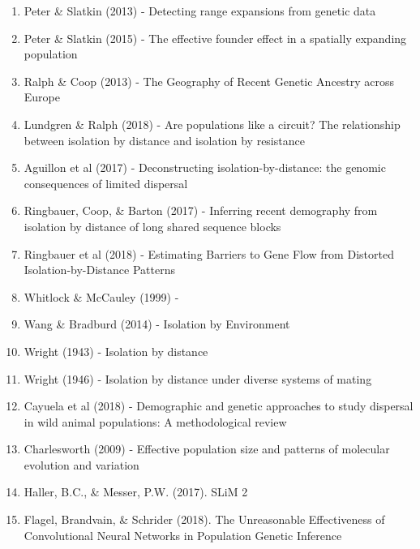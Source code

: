 \documentclass[12pt]{article}
\begin{document}
\begin{enumerate}
\item Peter \& Slatkin (2013) - Detecting range expansions from genetic data
\subitem 

\item Peter \& Slatkin (2015) - The effective founder effect in a spatially expanding population
\subitem 

\item Ralph \& Coop (2013) - The Geography of Recent Genetic Ancestry across Europe
\subitem 

\item Lundgren \& Ralph (2018) - Are populations like a circuit? 
The relationship between isolation by distance and isolation by resistance
\subitem 

\item Aguillon et al (2017) - Deconstructing isolation-by-distance: the genomic consequences of limited dispersal
\subitem 

\item Ringbauer, Coop, \& Barton (2017) - Inferring recent demography from isolation by distance of long shared sequence blocks
\subitem 

\item Ringbauer et al (2018) - Estimating Barriers to Gene Flow from Distorted Isolation-by-Distance Patterns
\subitem 

\item Whitlock \& McCauley (1999) - 
\subitem 

\item Wang \& Bradburd (2014) - Isolation by Environment
\subitem 

\item Wright (1943) - Isolation by distance
\subitem 

\item Wright (1946) - Isolation by distance under diverse systems of mating
\subitem 

\item Cayuela et al (2018) - Demographic and genetic approaches to study dispersal in wild animal populations: A methodological review
\subitem 

\item Charlesworth (2009) - Effective population size and patterns of molecular evolution and variation
\subitem 

\item Haller, B.C., \& Messer, P.W. (2017). SLiM 2
\subitem 

\item Flagel, Brandvain, \& Schrider (2018). The Unreasonable Effectiveness of Convolutional Neural
Networks in Population Genetic Inference
\subitem 


\end{enumerate}
\end{document}
